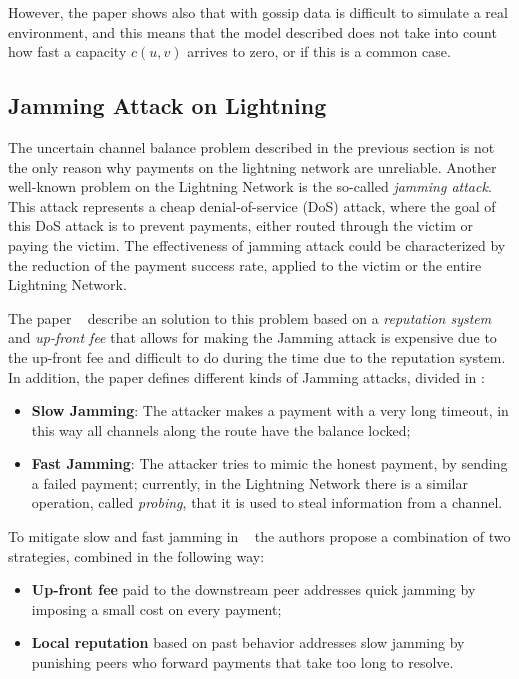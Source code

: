 However, the paper shows also that with gossip data is difficult to simulate 
a real environment, and this means that the model described does not take into 
count  how fast a capacity $c(u, v)$ arrives to zero, or if this is a 
common case.

\subsection{Jamming Attack on Lightning}\label{sec:jamming}

The uncertain channel balance problem described in the previous section 
is not the only reason why payments on the lightning network are unreliable.
Another well-known problem on the Lightning Network is the so-called \emph{jamming attack}. This attack represents a cheap 
denial-of-service (DoS) attack, where the goal of this DoS attack 
is to prevent payments, either routed through the victim or paying the victim. 
The effectiveness of jamming attack could be characterized by the reduction of the
payment success rate, applied to the victim or the entire Lightning Network.

The paper ~\cite{cryptoeprint:2022/1454} describe an solution to this problem 
based on a \emph{reputation system} and \emph{up-front fee} that allows for making
the Jamming attack is expensive due to the up-front fee and difficult to do during the time 
due to the reputation system.
In addition, the paper defines different kinds of Jamming attacks, divided in :

\begin{itemize}
    \item {\bf Slow Jamming}: The attacker makes a payment with a very long timeout, 
        in this way all channels along the route have the balance locked;
    \item {\bf Fast Jamming}: The attacker tries to mimic the honest payment, by sending
        a failed payment; currently, in the Lightning Network there is a similar operation, called \emph{probing},
        that it is used to steal information from a channel.
\end{itemize}

To mitigate slow and fast jamming in ~\cite{cryptoeprint:2022/1454} the authors
propose a combination of two strategies, combined in the following way:

\begin{itemize}
    \item {\bf Up-front fee} paid to the downstream peer addresses quick jamming 
        by imposing a small cost on every payment;
    \item {\bf Local reputation} based on past behavior addresses slow jamming by 
        punishing peers who forward payments that take too long to resolve.
\end{itemize}


